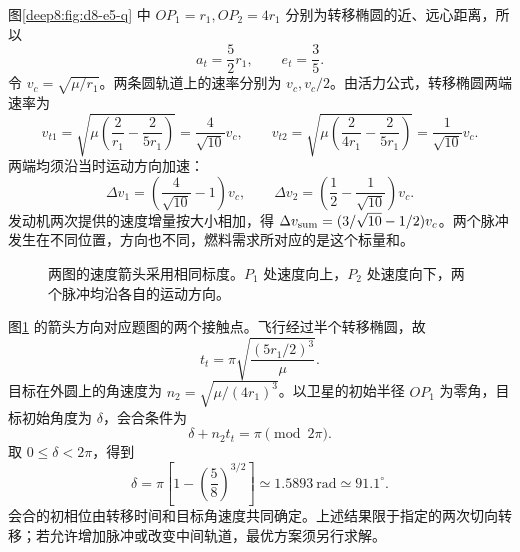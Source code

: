 \begin{solution}
图\ref{deep8:fig:d8-e5-q} 中 $OP_1=r_1,OP_2=4r_1$ 分别为转移椭圆的近、远心距离，所以
\[
 a_t=\frac52r_1,\qquad e_t=\frac35.
\]
令 $v_c=\sqrt{\mu/r_1}$。两条圆轨道上的速率分别为 $v_c,v_c/2$。由活力公式，转移椭圆两端速率为
\[
 v_{t1}=\sqrt{\mu\left(\frac2{r_1}-\frac2{5r_1}\right)}
       =\frac4{\sqrt{10}}v_c,\qquad
 v_{t2}=\sqrt{\mu\left(\frac2{4r_1}-\frac2{5r_1}\right)}
       =\frac1{\sqrt{10}}v_c.
\]
两端均须沿当时运动方向加速：
\[
 \Delta v_1=\left(\frac4{\sqrt{10}}-1\right)v_c,\qquad
 \Delta v_2=\left(\frac12-\frac1{\sqrt{10}}\right)v_c.
\]
发动机两次提供的速度增量按大小相加，得 $\Delta v_{\rm sum}=(3/\sqrt{10}-1/2)v_c$。两个脉冲发生在不同位置，方向也不同，燃料需求所对应的是这个标量和。
\begin{figure}[H]\centering
{}
\caption{两图的速度箭头采用相同标度。$P_1$ 处速度向上，$P_2$ 处速度向下，两个脉冲均沿各自的运动方向。}\label{deep8:fig:d8-e5-s}
\end{figure}
图\ref{deep8:fig:d8-e5-s} 的箭头方向对应题图的两个接触点。飞行经过半个转移椭圆，故
\[
 t_t=\pi\sqrt{\frac{(5r_1/2)^3}{\mu}}.
\]
目标在外圆上的角速度为 $n_2=\sqrt{\mu/(4r_1)^3}$。以卫星的初始半径 $OP_1$ 为零角，目标初始角度为 $\delta$，会合条件为
\[
 \delta+n_2t_t=\pi\pmod{2\pi}.
\]
取 $0\le\delta<2\pi$，得到
\[
 \boxed{\delta=\pi\left[1-\left(\frac58\right)^{3/2}\right]
 \simeq1.5893\ \mathrm{rad}\simeq91.1^\circ}.
\]
会合的初相位由转移时间和目标角速度共同确定。上述结果限于指定的两次切向转移；若允许增加脉冲或改变中间轨道，最优方案须另行求解。
\end{solution}




